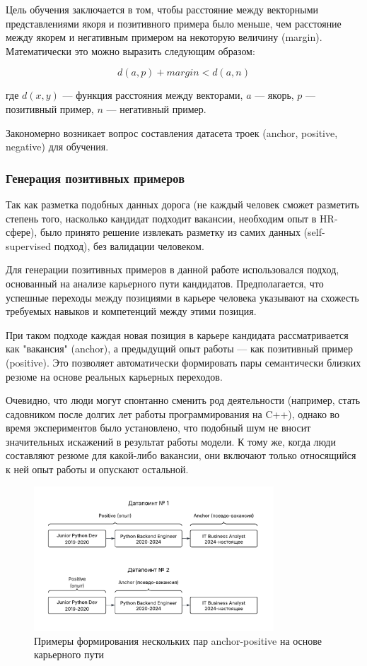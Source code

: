 \documentclass[14pt]{mmcs_article}
\begin{document}
Цель обучения заключается в том, чтобы расстояние между векторными представлениями якоря и позитивного примера было меньше, чем расстояние между якорем и негативным примером на некоторую величину (margin). Математически это можно выразить следующим образом:

\[ d(a,p) + margin < d(a,n) \]

где $d(x,y)$ --- функция расстояния между векторами, $a$ --- якорь, $p$ --- позитивный пример, $n$ --- негативный пример.

Закономерно возникает вопрос составления датасета троек (anchor, positive, negative) для обучения.

\subsubsection{Генерация позитивных примеров}

Так как разметка подобных данных дорога (не каждый человек сможет разметить степень того, насколько кандидат подходит вакансии, необходим опыт в HR-сфере), было принято решение извлекать разметку из самих данных (self-supervised подход), без валидации человеком.

Для генерации позитивных примеров в данной работе использовался подход, основанный на анализе карьерного пути кандидатов. Предполагается, что успешные переходы между позициями в карьере человека указывают на схожесть требуемых навыков и компетенций между этими позиция.

При таком подходе каждая новая позиция в карьере кандидата рассматривается как "вакансия" (anchor), а предыдущий опыт работы --- как позитивный пример (positive). Это позволяет автоматически формировать пары семантически близких резюме на основе реальных карьерных переходов.

Очевидно, что люди могут спонтанно сменить род деятельности (например, стать садовником после долгих лет работы программирования на C++), однако во время экспериментов было установлено, что подобный шум не вносит значительных искажений в результат работы модели. К тому же, когда люди составляют резюме для какой-либо вакансии, они включают только относящийся к ней опыт работы и опускают остальной.

\begin{figure}[h]
  \centering
  \includegraphics[width=0.8\textwidth]{plots/career_path_example.pdf}
  \caption{Примеры формирования нескольких пар anchor-positive на основе карьерного пути}
  \label{fig:career_path_example}
\end{figure}
\end{document}
